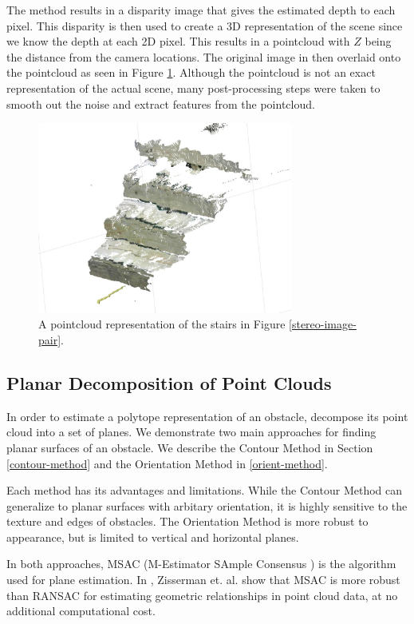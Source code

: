The method results in a disparity image that gives the estimated depth to each pixel. This disparity is then used to create a 3D representation of the scene since we know the depth at each 2D pixel. This results in a pointcloud with $Z$ being the distance from the camera locations. The original image in then overlaid onto the pointcloud as seen in Figure \ref{pointcloud-example}. Although the pointcloud is not an exact representation of the actual scene, many post-processing steps were taken to smooth out the noise and extract features from the pointcloud.
\begin{figure}[!h]
\centering
\includegraphics[width=3.3in]{Sections/Figures/example_stairs_pointcloud.jpg}
\caption{A pointcloud representation of the stairs in Figure \ref{stereo-image-pair}.}
\label{pointcloud-example}
\end{figure}

\subsection{Planar Decomposition of Point Clouds} \label{plane-section}

In order to estimate a polytope representation of an obstacle, decompose its point cloud into a set of planes. We demonstrate two main approaches for finding planar surfaces of an obstacle. We describe the Contour Method in Section \ref{contour-method} and the Orientation Method in \ref{orient-method}.

Each method has its advantages and limitations. While the Contour Method can generalize to planar surfaces with arbitary orientation, it is highly sensitive to the texture and edges of obstacles. The Orientation Method is more robust to appearance, but is limited to vertical and horizontal planes.

In both approaches, MSAC (M-Estimator SAmple Consensus \cite{msac-article}) is the algorithm used for plane estimation. In \cite{msac-article}, Zisserman et. al. show that MSAC is more robust than RANSAC for estimating geometric relationships in point cloud data, at no additional computational cost.

